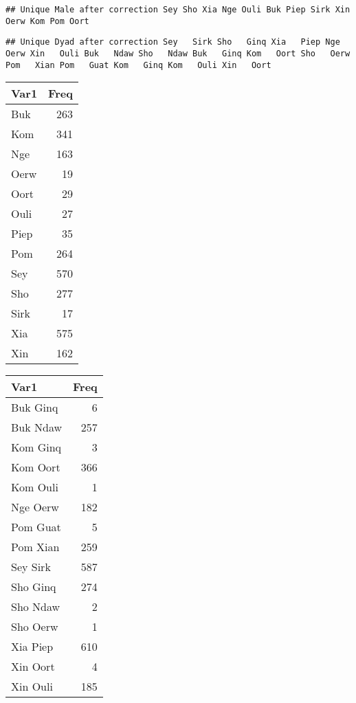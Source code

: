 \documentclass[
]{article}
\begin{document}
\begin{verbatim}
## Unique Male after correction Sey Sho Xia Nge Ouli Buk Piep Sirk Xin Oerw Kom Pom Oort
\end{verbatim}

\begin{verbatim}
## Unique Dyad after correction Sey   Sirk Sho   Ginq Xia   Piep Nge   Oerw Xin   Ouli Buk   Ndaw Sho   Ndaw Buk   Ginq Kom   Oort Sho   Oerw Pom   Xian Pom   Guat Kom   Ginq Kom   Ouli Xin   Oort
\end{verbatim}

\begin{longtable}[]{@{}lr@{}}
\toprule
Var1 & Freq \\
\midrule
\endhead
Buk & 263 \\
Kom & 341 \\
Nge & 163 \\
Oerw & 19 \\
Oort & 29 \\
Ouli & 27 \\
Piep & 35 \\
Pom & 264 \\
Sey & 570 \\
Sho & 277 \\
Sirk & 17 \\
Xia & 575 \\
Xin & 162 \\
\bottomrule
\end{longtable}

\begin{longtable}[]{@{}lr@{}}
\toprule
Var1 & Freq \\
\midrule
\endhead
Buk Ginq & 6 \\
Buk Ndaw & 257 \\
Kom Ginq & 3 \\
Kom Oort & 366 \\
Kom Ouli & 1 \\
Nge Oerw & 182 \\
Pom Guat & 5 \\
Pom Xian & 259 \\
Sey Sirk & 587 \\
Sho Ginq & 274 \\
Sho Ndaw & 2 \\
Sho Oerw & 1 \\
Xia Piep & 610 \\
Xin Oort & 4 \\
Xin Ouli & 185 \\
\bottomrule
\end{longtable}
\end{document}
